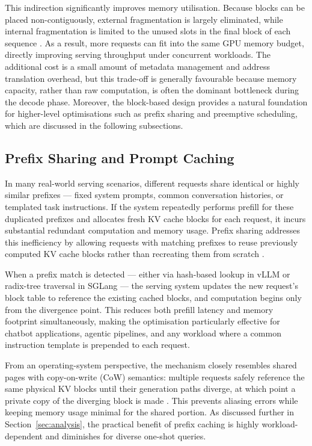 \documentclass[10pt, a4paper]{article}
\begin{document}
This indirection significantly improves memory utilisation.
Because blocks can be placed non-contiguously, external fragmentation
is largely eliminated, while internal fragmentation is limited to the
unused slots in the final block of each sequence \cite{kwon2023vllm}.
As a result, more requests can fit into the same GPU memory budget,
directly improving serving throughput under concurrent workloads.
The additional cost is a small amount of metadata management and
address translation overhead, but this trade-off is generally
favourable because memory capacity, rather than raw computation, is
often the dominant bottleneck during the decode phase.
Moreover, the block-based design provides a natural foundation for
higher-level optimisations such as prefix sharing and preemptive
scheduling, which are discussed in the following subsections.


\subsection{Prefix Sharing and Prompt Caching}

In many real-world serving scenarios, different requests share identical
or highly similar prefixes --- fixed system prompts, common conversation
histories, or templated task instructions.
If the system repeatedly performs prefill for these duplicated prefixes
and allocates fresh KV cache blocks for each request, it incurs
substantial redundant computation and memory usage.
Prefix sharing addresses this inefficiency by allowing requests with
matching prefixes to reuse previously computed KV cache blocks rather
than recreating them from scratch \cite{kwon2023vllm}.

When a prefix match is detected --- either via hash-based lookup in
vLLM or radix-tree traversal in SGLang \cite{zheng2024sglang} --- the
serving system updates the new request's block table to reference the
existing cached blocks, and computation begins only from the
divergence point.
This reduces both prefill latency and memory footprint simultaneously,
making the optimisation particularly effective for chatbot applications,
agentic pipelines, and any workload where a common instruction template
is prepended to each request.

From an operating-system perspective, the mechanism closely resembles
shared pages with copy-on-write (CoW) semantics: multiple requests
safely reference the same physical KV blocks until their generation
paths diverge, at which point a private copy of the diverging block is
made \cite{silberschatz2018os}.
This prevents aliasing errors while keeping memory usage minimal for
the shared portion.
As discussed further in Section~\ref{sec:analysis}, the practical
benefit of prefix caching is highly workload-dependent and diminishes
for diverse one-shot queries.
\end{document}
